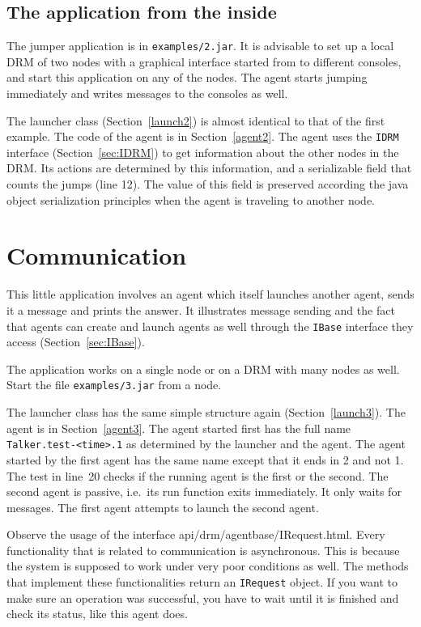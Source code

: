 \documentclass{article}
\begin{document}
\subsection{The application from the inside}

The jumper application is in {\tt examples/2.jar}.
It is advisable to set up a local DRM of two nodes with a graphical interface
started from to different consoles,
and start this application on any of the nodes.
The agent starts jumping immediately and writes messages to the consoles
as well.

The launcher class (Section~\ref{launch2}) is almost identical to that of
the first example.
The code of the agent is in Section~\ref{agent2}.
The agent uses the {\tt IDRM} interface (Section~\ref{sec:IDRM}) to get
information about the other nodes in the DRM.
Its actions are determined by this information, and a serializable field
that counts the jumps (line 12).
The value of this field is preserved according the java object serialization
principles when the agent is traveling to another node.

\section{Communication}
\label{sec:comm}

This little application involves an agent which itself launches another
agent, sends it a message and prints the answer.
It illustrates message sending and the fact that agents can create and launch
agents as well through the {\tt IBase} interface they access
(Section~\ref{sec:IBase}).

The application works on a single node or on a DRM with many nodes as well.
Start the file {\tt examples/3.jar} from a node.

The launcher class has the same simple structure again (Section~\ref{launch3}).
The agent is in Section~\ref{agent3}.
The agent started first has the full name
{\tt Talker.test-<time>.1} as determined by the launcher and the agent.
The agent started by the first agent has the same name except that it ends in
2 and not 1.
The test in line~20 checks if the running agent is the first or the second.
The second agent is passive, i.e.\ its run function exits immediately.
It only waits for messages.
The first agent attempts to launch the second agent.

Observe the usage of the interface
{api/drm/agentbase/IRequest.html}.
Every functionality that is related to communication is asynchronous.
This is because the system is supposed to work under very poor conditions
as well.
The methods that implement these functionalities return
an {\tt IRequest} object.
If you want to make sure an operation was successful, you have to wait
until it is finished and check its status, like this agent does.
\end{document}
